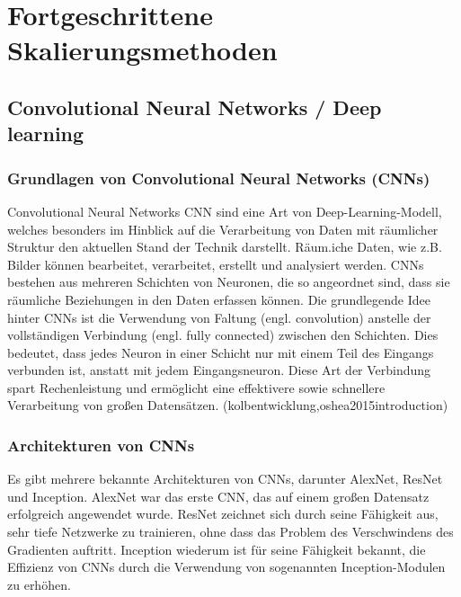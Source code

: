 


\chapter{Fortgeschrittene Skalierungsmethoden}
\section{Convolutional Neural Networks / Deep learning}
    \subsection{Grundlagen von Convolutional Neural Networks (CNNs)}
        Convolutional Neural Networks \ac{CNN} sind eine Art von Deep-Learning-Modell, welches besonders im Hinblick auf die Verarbeitung von Daten mit räumlicher Struktur den aktuellen Stand der Technik darstellt.      
        Räum.iche Daten, wie z.B.      Bilder können bearbeitet, verarbeitet, erstellt und analysiert werden.      
        CNNs bestehen aus mehreren Schichten von Neuronen, die so angeordnet sind, dass sie räumliche Beziehungen in den Daten erfassen können.
        Die grundlegende Idee hinter CNNs ist die Verwendung von Faltung (engl.      convolution) anstelle der vollständigen Verbindung (engl.      fully connected) zwischen den Schichten.      
        Dies bedeutet, dass jedes Neuron in einer Schicht nur mit einem Teil des Eingangs verbunden ist, anstatt mit jedem Eingangsneuron.      
        Diese Art der Verbindung spart Rechenleistung und ermöglicht eine effektivere sowie schnellere Verarbeitung von großen Datensätzen.
        \footfullcite(kolbentwicklung,oshea2015introduction)
    \subsection{Architekturen von CNNs}
    
        Es gibt mehrere bekannte Architekturen von CNNs, darunter AlexNet, ResNet und Inception.      
        AlexNet war das erste CNN, das auf einem großen Datensatz erfolgreich angewendet wurde.      
        ResNet zeichnet sich durch seine Fähigkeit aus, sehr tiefe Netzwerke zu trainieren, ohne dass das Problem des Verschwindens des Gradienten auftritt.      
        Inception wiederum ist für seine Fähigkeit bekannt, die Effizienz von CNNs durch die Verwendung von sogenannten Inception-Modulen zu erhöhen.

